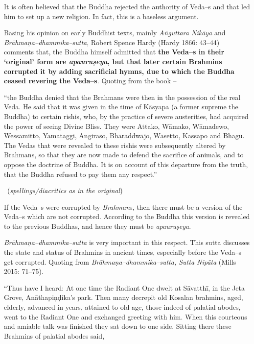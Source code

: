It is often believed that the Buddha rejected the authority of Veda–s and that led him to set up a new religion. In fact, this is a baseless argument.

Basing his opinion on early Buddhist texts, mainly \textit{Aṅguttara Nikāya} and \textit{Brāhmaṇa–dhammika–sutta}, Robert Spence Hardy (Hardy 1866: 43–44) comments that, the Buddha himself admitted that \textbf{the Veda–s in their ‘original’ form are \textit{apauruṣeya}, but that later certain Brahmins corrupted it by adding sacrificial hymns, due to which the Buddha ceased revering the Veda–s}. Quoting from the book –

\begin{myquote}
“the Buddha denied that the Brahmans were then in the possession of the real Veda. He said that it was given in the time of Kāsyapa (a former supreme the Buddha) to certain rishis, who, by the practice of severe austerities, had acquired the power of seeing Divine Bliss. They were Attako, Wāmako, Wāmadewo, Wessāmitto, Yamataggi, Angiraso, Bhāraddwājo, Wāsetto, Kassapo and Bhagu. The Vedas that were revealed to these rishis were subsequently altered by Brahmans, so that they are now made to defend the sacrifice of animals, and to oppose the doctrine of Buddha. It is on account of this departure from the truth, that the Buddha refused to pay them any respect.” 

~\hfill (\textit{spellings/diacritics as in the original})
\end{myquote}

If the Veda–s were corrupted by \textit{Brahman}s, then there must be a version of the Veda–s which are not corrupted. According to the Buddha this version is revealed to the previous Buddhas, and hence they must be \textit{apauruṣeya}.

\textit{Brāhmaṇa–dhammika–sutta} is very important in this respect. This sutta discusses the state and status of Brahmins in ancient times, especially before the Veda–s get corrupted. Quoting from \textit{Brāhmaṇa–dhammika–sutta, Sutta Nipāta} (Mills 2015: 71–75).

“Thus have I heard: At one time the Radiant One dwelt at Sāvatthī, in the Jeta Grove, Anāthapiṇḍika’s park. Then many decrepit old Kosalan brahmins, aged, elderly, advanced in years, attained to old age, those indeed of palatial abodes, went to the Radiant One and exchanged greeting with him. When this courteous and amiable talk was finished they sat down to one side. Sitting there these Brahmins of palatial abodes said,

